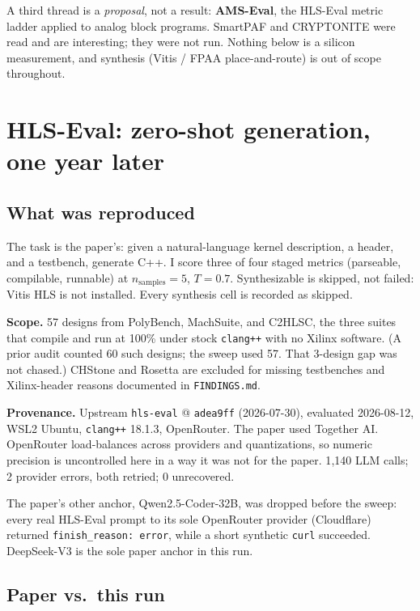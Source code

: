 \documentclass[11pt]{article}
\newcommand{\code}[1]{\texttt{#1}}
\begin{document}
A third thread is a \emph{proposal}, not a result: \textbf{AMS-Eval},
the HLS-Eval metric ladder applied to analog block programs. SmartPAF
and CRYPTONITE were read and are interesting; they were not run.
Nothing below is a silicon measurement, and synthesis (Vitis / FPAA
place-and-route) is out of scope throughout.

\section{HLS-Eval: zero-shot generation, one year later}
\label{sec:hls}

\subsection{What was reproduced}

The task is the paper's: given a natural-language kernel description, a
header, and a testbench, generate C++. I score three of four staged
metrics (parseable, compilable, runnable) at
$n_{\text{samples}}=5$, $T=0.7$. Synthesizable is skipped, not failed:
Vitis HLS is not installed. Every synthesis cell is recorded as
skipped.

\textbf{Scope.} 57 designs from PolyBench, MachSuite, and C2HLSC, the
three suites that compile and run at 100\% under stock \code{clang++}
with no Xilinx software. (A prior audit counted 60 such designs; the
sweep used 57. That 3-design gap was not chased.) CHStone and Rosetta
are excluded for missing testbenches and Xilinx-header reasons
documented in \code{FINDINGS.md}.

\textbf{Provenance.} Upstream \code{hls-eval} @ \code{adea9ff}
(2026-07-30), evaluated 2026-08-12, WSL2 Ubuntu, \code{clang++} 18.1.3,
OpenRouter. The paper used Together AI. OpenRouter load-balances across
providers and quantizations, so numeric precision is uncontrolled here
in a way it was not for the paper. 1{,}140 LLM calls; 2 provider errors,
both retried; 0 unrecovered.

The paper's other anchor, Qwen2.5-Coder-32B, was dropped before the
sweep: every real HLS-Eval prompt to its sole OpenRouter provider
(Cloudflare) returned \code{finish\_reason: error}, while a short
synthetic \code{curl} succeeded. DeepSeek-V3 is the sole paper anchor
in this run.

\subsection{Paper vs.\ this run}
\end{document}
